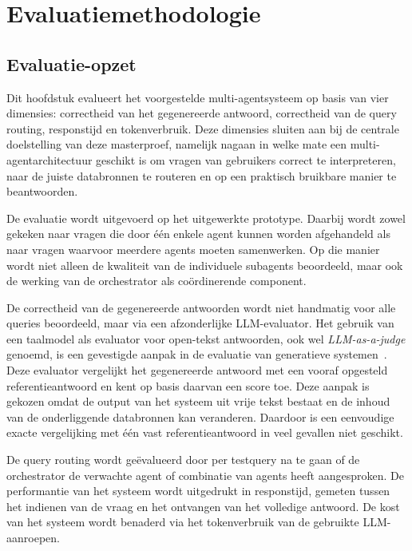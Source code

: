 \chapter{Evaluatiemethodologie}
\label{chap:evaluatie}

\section{Evaluatie-opzet}
\label{sec:evaluatie-opzet}

Dit hoofdstuk evalueert het voorgestelde multi-agentsysteem op basis van vier dimensies: correctheid van het gegenereerde antwoord, correctheid van de query routing, responstijd en tokenverbruik. Deze dimensies sluiten aan bij de centrale doelstelling van deze masterproef, namelijk nagaan in welke mate een multi-agentarchitectuur geschikt is om vragen van gebruikers correct te interpreteren, naar de juiste databronnen te routeren en op een praktisch bruikbare manier te beantwoorden.

De evaluatie wordt uitgevoerd op het uitgewerkte prototype. Daarbij wordt zowel gekeken naar vragen die door één enkele agent kunnen worden afgehandeld als naar vragen waarvoor meerdere agents moeten samenwerken. Op die manier wordt niet alleen de kwaliteit van de individuele subagents beoordeeld, maar ook de werking van de orchestrator als coördinerende component.

De correctheid van de gegenereerde antwoorden wordt niet handmatig voor alle queries beoordeeld, maar via een afzonderlijke \gls{LLM}-evaluator. Het gebruik van een taalmodel als evaluator voor open-tekst antwoorden, ook wel \textit{LLM-as-a-judge} genoemd, is een gevestigde aanpak in de evaluatie van generatieve systemen~\cite{zheng2023judging}. Deze evaluator vergelijkt het gegenereerde antwoord met een vooraf opgesteld referentieantwoord en kent op basis daarvan een score toe. Deze aanpak is gekozen omdat de output van het systeem uit vrije tekst bestaat en de inhoud van de onderliggende databronnen kan veranderen. Daardoor is een eenvoudige exacte vergelijking met één vast referentieantwoord in veel gevallen niet geschikt.

De query routing wordt geëvalueerd door per testquery na te gaan of de orchestrator de verwachte agent of combinatie van agents heeft aangesproken. De performantie van het systeem wordt uitgedrukt in responstijd, gemeten tussen het indienen van de vraag en het ontvangen van het volledige antwoord. De kost van het systeem wordt benaderd via het tokenverbruik van de gebruikte \gls{LLM}-aanroepen.

